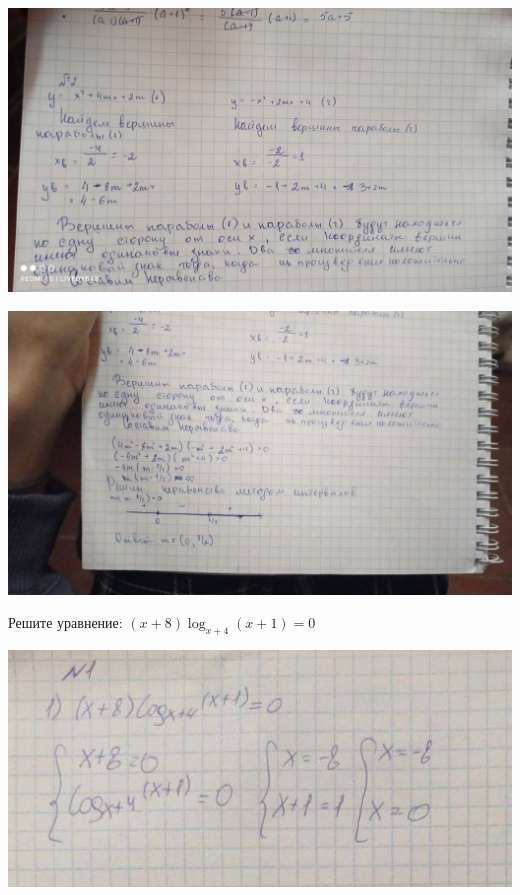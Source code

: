 \documentclass[10pt,]{article}
\begin{document}
\begin{listofex}
 	\begin{center}
 		\includegraphics[align=t, width=1\linewidth]{../exercises/lists/pics/curator5}
 	\end{center}
	 \begin{center}
	 	\includegraphics[align=t, width=1\linewidth]{../exercises/lists/pics/curator6}
	 \end{center}
 \newpage
 	\item Решите уравнение: \((x+8)\log_{x+4}(x+1)=0\)
 	\begin{center}
 		\includegraphics[align=t, width=1\linewidth]{../exercises/lists/pics/curator7}

\end{center}
\end{listofex}
\end{document}
